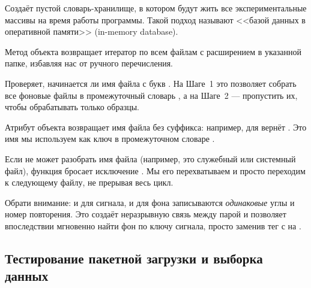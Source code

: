 \begin{syntaxdesc}
    \item[Инициализация базы данных \mycode{data_store = dict()} (строка 2)] Создаёт пустой словарь-хранилище, в котором будут жить все экспериментальные массивы на время работы программы. Такой подход называют <<базой данных в оперативной памяти>> (in-memory database).
    \item[Сканирование директории \mycode{path.glob("*.txt")} (строки 7, 14)] Метод объекта  возвращает итератор по всем файлам с расширением  в указанной папке, избавляя нас от ручного перечисления.
    \item[Критерий фонового файла \mycode{filepath.name.startswith("bg")} (строки 8, 16)] Проверяет, начинается ли имя файла с букв . На Шаге~1 это позволяет собрать все фоновые файлы в промежуточный словарь , а на Шаге~2 --- пропустить их, чтобы обрабатывать только образцы.
    \item[Получение имени без расширения \mycode{filepath.stem} (строка 9)] Атрибут  объекта  возвращает имя файла без суффикса: например, для  вернёт . Это имя мы используем как ключ в промежуточном словаре .
    \item[Пропуск нераспознанных файлов \mycode{except ValueError: continue} (строки 21--22)] Если  не может разобрать имя файла (например, это служебный или системный файл), функция бросает исключение . Мы его перехватываем и просто переходим к следующему файлу, не прерывая весь цикл.
    \item[Запись в базу \mycode{data_store[('signal_raw', angle1, angle2, rep)] = (t, E_signal)} (строки 27, 32)] Обрати внимание: и для сигнала, и для фона записываются \textit{одинаковые} углы и номер повторения. Это создаёт неразрывную связь между парой и позволяет впоследствии мгновенно найти фон по ключу сигнала, просто заменив тег с  на .
\end{syntaxdesc}


\subsection{Тестирование пакетной загрузки и выборка данных}\label{ssec:db_test}


